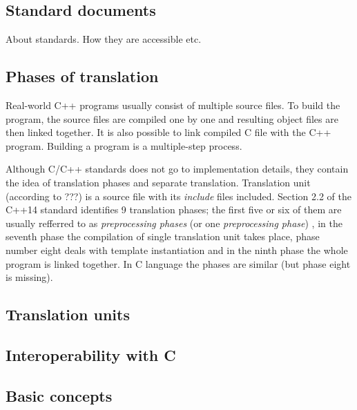 \documentclass{fithesis3}
\begin{document}

\subsection{Standard documents}

About standards. How they are accessible etc.

\subsection{Phases of translation}
\label{txt:phases-of-translation}
Real-world C++ programs usually consist of multiple source files. To build the program, the source files are compiled one by one and resulting object files are then linked together. It is also possible to link compiled C file with the C++ program. Building a program is a multiple-step process.


Although C/C++ standards does not go to implementation details, they contain the idea of translation phases and separate translation. Translation unit (according to ???) is a source file with its \textit{include} files included. Section 2.2 of the C++14 standard identifies 9 translation phases; the first five or six of them are usually refferred to as \textit{preprocessing phases} (or one \textit{preprocessing phase}) , in the seventh phase the compilation of single translation unit takes place, phase number eight deals with template instantiation and in the ninth phase the whole program is linked together. In C language the phases are similar (but phase eight is missing).

\subsection{Translation units}

\subsection{Interoperability with C}

\subsection{Basic concepts}

\end{document}
